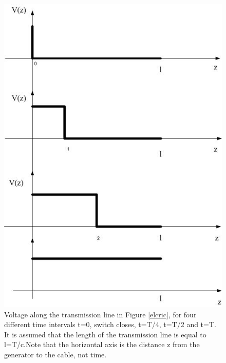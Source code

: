 \documentclass{ximera}
\begin{document}
\begin{example}
\begin{figure}[htbp]
\begin{center}
\includegraphics[scale=0.5]{../jpg/timedelayedsignaltl.jpg}
\end{center}
\caption{Voltage along the transmission line in Figure \ref{elcric}, for four different time intervals t=0, switch closes, t=T/4, t=T/2 and t=T. It is assumed that the length of the transmission line is equal to l=T/c.Note that the horizontal axis is the distance z from the generator to the cable, not time. }
\label{delayedsig}
\end{figure}

\end{example}
\end{document}
